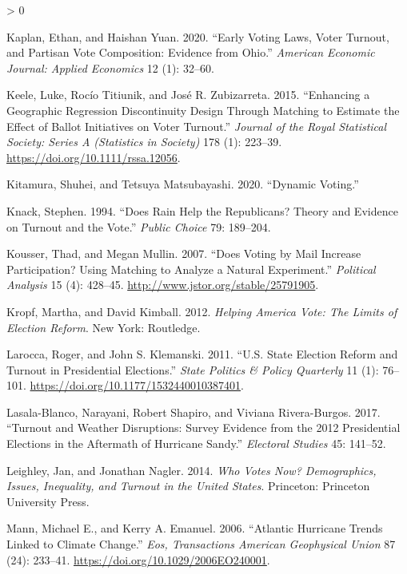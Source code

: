 \documentclass[
  12pt,
]{article}
\newlength{\cslhangindent}
\newenvironment{CSLReferences}[2] %
 {%
  \setlength{\parindent}{0pt}
  \ifodd #1 \everypar{\setlength{\hangindent}{\cslhangindent}}\ignorespaces\fi
  \ifnum #2 > 0
  \setlength{\parskip}{#2\baselineskip}
  \fi
 }%
 {}
\begin{document}
\begin{CSLReferences}{1}{0}
\leavevmode\hypertarget{ref-Kaplan2020}{}%
Kaplan, Ethan, and Haishan Yuan. 2020. {``Early {Voting Laws}, {Voter Turnout}, and {Partisan Vote Composition}: {Evidence} from {Ohio}.''} \emph{American Economic Journal: Applied Economics} 12 (1): 32--60.

\leavevmode\hypertarget{ref-Keele2015a}{}%
Keele, Luke, Rocío Titiunik, and José R. Zubizarreta. 2015. {``Enhancing a Geographic Regression Discontinuity Design Through Matching to Estimate the Effect of Ballot Initiatives on Voter Turnout.''} \emph{Journal of the Royal Statistical Society: Series A (Statistics in Society)} 178 (1): 223--39. \url{https://doi.org/10.1111/rssa.12056}.

\leavevmode\hypertarget{ref-Kitamura2020}{}%
Kitamura, Shuhei, and Tetsuya Matsubayashi. 2020. {``Dynamic {Voting}.''}

\leavevmode\hypertarget{ref-Knack1994}{}%
Knack, Stephen. 1994. {``Does {Rain Help} the {Republicans}? {Theory} and {Evidence} on {Turnout} and the {Vote}.''} \emph{Public Choice} 79: 189--204.

\leavevmode\hypertarget{ref-Kousser2007}{}%
Kousser, Thad, and Megan Mullin. 2007. {``Does {Voting} by {Mail Increase Participation}? {Using Matching} to {Analyze} a {Natural Experiment}.''} \emph{Political Analysis} 15 (4): 428--45. \url{http://www.jstor.org/stable/25791905}.

\leavevmode\hypertarget{ref-Kropf2012}{}%
Kropf, Martha, and David Kimball. 2012. \emph{Helping {America Vote}: {The Limits} of {Election Reform}}. {New York}: {Routledge}.

\leavevmode\hypertarget{ref-Larocca2011}{}%
Larocca, Roger, and John S. Klemanski. 2011. {``U.{S}. {State Election Reform} and {Turnout} in {Presidential Elections}.''} \emph{State Politics \& Policy Quarterly} 11 (1): 76--101. \url{https://doi.org/10.1177/1532440010387401}.

\leavevmode\hypertarget{ref-Lasala-Blanco2017}{}%
Lasala-Blanco, Narayani, Robert Shapiro, and Viviana Rivera-Burgos. 2017. {``Turnout and {Weather Disruptions}: {Survey Evidence} from the 2012 {Presidential Elections} in the {Aftermath} of {Hurricane Sandy}.''} \emph{Electoral Studies} 45: 141--52.

\leavevmode\hypertarget{ref-Leighley2014}{}%
Leighley, Jan, and Jonathan Nagler. 2014. \emph{Who {Votes Now}? {Demographics}, {Issues}, {Inequality}, and {Turnout} in the {United States}}. {Princeton}: {Princeton University Press}.

\leavevmode\hypertarget{ref-Mann2006}{}%
Mann, Michael E., and Kerry A. Emanuel. 2006. {``Atlantic Hurricane Trends Linked to Climate Change.''} \emph{Eos, Transactions American Geophysical Union} 87 (24): 233--41. \url{https://doi.org/10.1029/2006EO240001}.


\end{CSLReferences}
\end{document}
